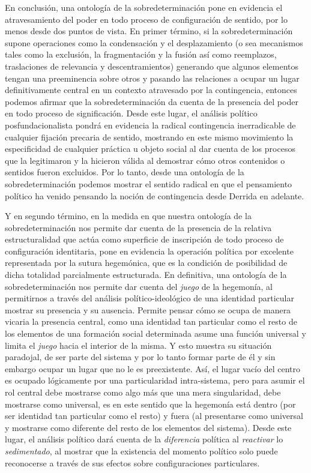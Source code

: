 En conclusión, una ontología de la sobredeterminación pone en evidencia
el atravesamiento del poder en todo proceso de configuración de sentido,
por lo menos desde dos puntos de vista. En primer término, si la
sobredeterminación supone operaciones como la condensación y el
desplazamiento (o sea mecanismos tales como la exclusión, la
fragmentación y la fusión así como reemplazos, traslaciones de
relevancia y descentramientos) generando que algunos elementos tengan
una preeminencia sobre otros y pasando las relaciones a ocupar un lugar
definitivamente central en un contexto atravesado por la contingencia,
entonces podemos afirmar que la sobredeterminación da cuenta de la
presencia del poder en todo proceso de significación. Desde este lugar,
el análisis político posfundacionalista pondrá en evidencia la radical
contingencia inerradicable de cualquier fijación precaria de sentido,
mostrando en este mismo movimiento la especificidad de cualquier
práctica u objeto social al dar cuenta de los procesos que la
legitimaron y la hicieron válida al demostrar cómo otros contenidos o
sentidos fueron excluidos. Por lo tanto, desde una ontología de la
sobredeterminación podemos mostrar el sentido radical en que el
pensamiento político ha venido pensando la noción de contingencia desde
Derrida en adelante.

Y en segundo término, en la medida en que nuestra ontología de la
sobredeterminación nos permite dar cuenta de la presencia de la relativa
estructuralidad que actúa como superficie de inscripción de todo proceso
de configuración identitaria, pone en evidencia la operación política
por excelente representada por la sutura hegemónica, que es la condición
de posibilidad de dicha totalidad parcialmente estructurada. En
definitiva, una ontología de la sobredeterminación nos permite dar
cuenta del \emph{juego} de la hegemonía, al permitirnos a través del
análisis político-ideológico de una identidad particular mostrar su
presencia y su ausencia. Permite pensar cómo se ocupa de manera vicaria
la presencia central, como una identidad tan particular como el resto de
los elementos de una formación social determinada asume una función
universal y limita el \emph{juego} hacia el interior de la misma. Y esto
muestra su situación paradojal, de ser parte del sistema y por lo tanto
formar parte de él y sin embargo ocupar un lugar que no le es
preexistente. Así, el lugar vacío del centro es ocupado lógicamente por
una particularidad intra-sistema, pero para asumir el rol central debe
mostrarse como algo más que una mera singularidad, debe mostrarse como
universal, es en este sentido que la hegemonía está dentro (por ser
identidad tan particular como el resto) y fuera (al presentarse como
universal y mostrarse como diferente del resto de los elementos del
sistema). Desde este lugar, el análisis político dará cuenta de la
\emph{diferencia} política al \emph{reactivar} lo \emph{sedimentado}, al
mostrar que la existencia del momento político solo puede reconocerse a
través de sus efectos sobre configuraciones particulares.

